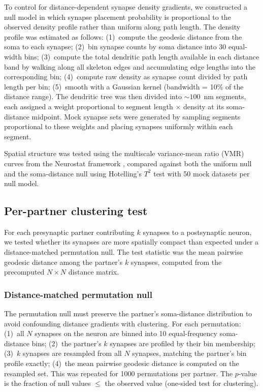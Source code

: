 To control for distance-dependent synapse density gradients, we constructed a null model in which synapse placement probability is proportional to the observed density profile rather than uniform along path length. The density profile was estimated as follows: (1)~compute the geodesic distance from the soma to each synapse; (2)~bin synapse counts by soma distance into 30 equal-width bins; (3)~compute the total dendritic path length available in each distance band by walking along all skeleton edges and accumulating edge lengths into the corresponding bin; (4)~compute raw density as synapse count divided by path length per bin; (5)~smooth with a Gaussian kernel (bandwidth = 10\% of the distance range). The dendritic tree was then divided into ${\sim}100$~nm segments, each assigned a weight proportional to segment length $\times$ density at its soma-distance midpoint. Mock synapse sets were generated by sampling segments proportional to these weights and placing synapses uniformly within each segment.

Spatial structure was tested using the multiscale variance-mean ratio (VMR) curves from the Neurostat framework \citep{neurostat}, compared against both the uniform null and the soma-distance null using Hotelling's $T^2$ test with 50 mock datasets per null model.

\subsection{Per-partner clustering test}

For each presynaptic partner contributing $k$ synapses to a postsynaptic neuron, we tested whether its synapses are more spatially compact than expected under a distance-matched permutation null. The test statistic was the mean pairwise geodesic distance among the partner's $k$ synapses, computed from the precomputed $N \times N$ distance matrix.

\subsubsection{Distance-matched permutation null}

The permutation null must preserve the partner's soma-distance distribution to avoid confounding distance gradients with clustering. For each permutation: (1)~all $N$ synapses on the neuron are binned into 10 equal-frequency soma-distance bins; (2)~the partner's $k$ synapses are profiled by their bin membership; (3)~$k$ synapses are resampled from all $N$ synapses, matching the partner's bin profile exactly; (4)~the mean pairwise geodesic distance is computed on the resampled set. This was repeated for 1000 permutations per partner. The $p$-value is the fraction of null values $\leq$ the observed value (one-sided test for clustering).

